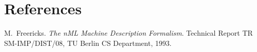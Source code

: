 \documentclass[oneside,final,12pt]{extreport}
\begin{document}
\section{References}



\begin{thebibliography}{1}

M.~Freericks.
\emph{The nML Machine Description Formalism}.
Technical Report TR SM-IMP/DIST/08, TU Berlin CS Department, 1993.

\end{thebibliography}
\end{document}
